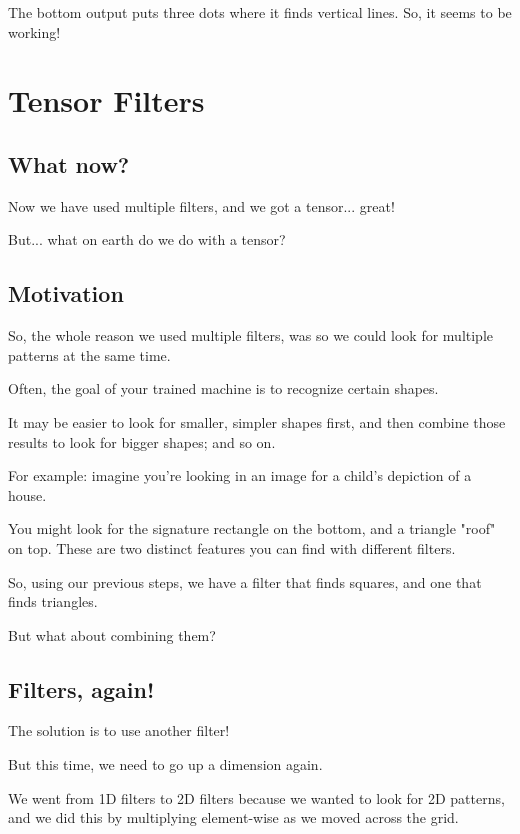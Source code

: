         The bottom output puts three dots where it finds vertical lines. So, it seems to be working!
        
\section{Tensor Filters}

    \subsection{What now?}

        Now we have used multiple filters, and we got a tensor... great! 
        
        But... what on earth do we do with a tensor?
        
    \subsection{Motivation}
    
        So, the whole reason we used multiple filters, was so we could look for multiple patterns at the same time.
        
        Often, the goal of your trained machine is to recognize certain shapes.
        
        It may be easier to look for smaller, simpler shapes first, and then combine those results to look for bigger shapes; and so on.

        For example: imagine you're looking in an image for a child's depiction of a house. 
        
        You might look for the signature rectangle on the bottom, and a triangle "roof" on top. These are two distinct features you can find with different filters.
        
        So, using our previous steps, we have a filter that finds squares, and one that finds triangles.
        
        But what about combining them?
        
    \subsection{Filters, again!}
    
        The solution is to use another filter!
        
        But this time, we need to go up a dimension again.
        
        We went from 1D filters to 2D filters because we wanted to look for 2D patterns, and we did this by multiplying element-wise as we moved across the grid.
        
